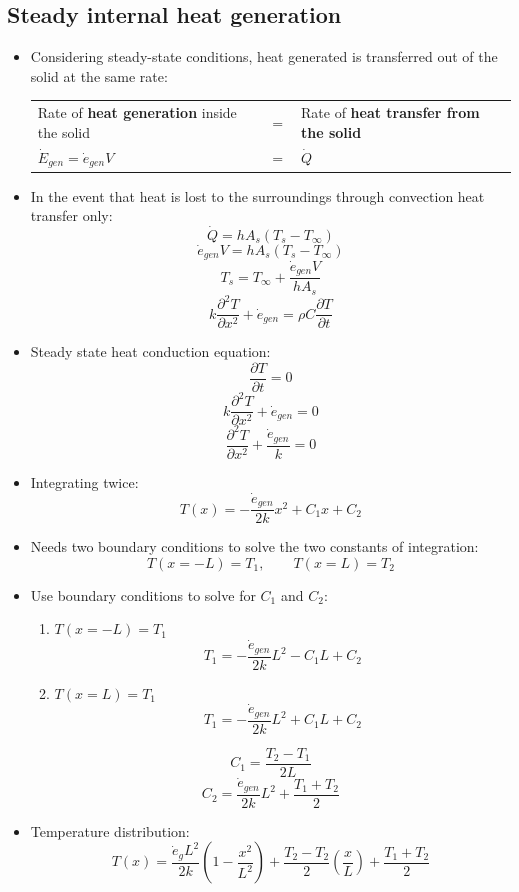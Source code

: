 \documentclass[11pt]{article}
\begin{document}
\subsection{Steady internal heat generation}
\label{sec:org475ca22}
\begin{itemize}
\item Considering steady-state conditions, heat generated is transferred out of the solid at the same rate:
\begin{center}
\begin{tabular}{>{\centering\arraybackslash}m{12em} >{\centering\arraybackslash}m{1em} >{\centering\arraybackslash}m{12em}}
Rate of \textbf{heat generation} inside the solid & \(=\) & Rate of \textbf{heat transfer from the solid}\\[0pt]
\(\dot{E}_{gen} = \dot{e}_{gen} V\) & \(=\) & \(\dot{Q}\)\\[0pt]
\end{tabular}
\end{center}
\item In the event that heat is lost to the surroundings through convection heat transfer only:
\[\dot{Q} = h A_s (T_s - T_{\infty})\]
\[\dot{e}_{gen} V = h A_s (T_s - T_{\infty})\]
\[T_s = T_{\infty} + \frac{\dot{e}_{gen} V}{h A_s}\]
\[k \frac{\partial^2 T}{\partial x^2} + \dot{e}_{gen} = \rho C \frac{\partial T}{\partial t}\]
\item Steady state heat conduction equation:
\[\frac{\partial T}{\partial t} = 0\]
\[k \frac{\partial^2 T}{\partial x^2} + \dot{e}_{gen} = 0\]
\[\frac{\partial^2 T}{\partial x^2} + \frac{\dot{e}_{gen}}{k} = 0\]
\item Integrating twice:
\[T(x) = - \frac{\dot{e}_{gen}}{2k} x^2 + C_1 x + C_2\]
\item Needs two boundary conditions to solve the two constants of integration:
\[T(x = -L) = T_1, \qquad T(x = L) = T_2\]
\end{itemize}

 \newpage

\begin{itemize}
\item Use boundary conditions to solve for \(C_1\) and \(C_2\):
\begin{enumerate}
\item \(T(x = -L) = T_1\)
\[T_1 = - \frac{\dot{e}_{gen}}{2k} L^2 - C_1 L + C_2\]
\item \(T(x = L) = T_1\)
\[T_1 = - \frac{\dot{e}_{gen}}{2k} L^2 + C_1 L + C_2\]
\end{enumerate}
\[C_1 = \frac{T_2 - T_1}{2L}\]
\[C_2 = \frac{\dot{e}_{gen}}{2k} L^2 + \frac{T_1 + T_2}{2}\]
\item Temperature distribution:
\[T(x) = \frac{\dot{e}_g L^2}{2k} \left(1 - \frac{x^2}{L^2} \right) + \frac{T_2 - T_2}{2} \left(\frac{x}{L} \right) + \frac{T_1 + T_2}{2}\]
\end{itemize}
\end{document}
